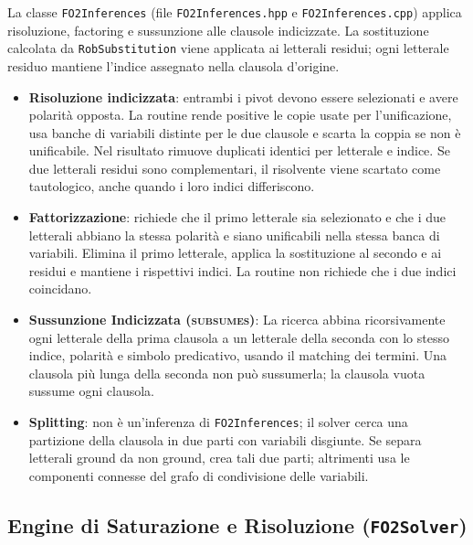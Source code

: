 La classe \texttt{FO2Inferences} (file \texttt{FO2Inferences.hpp} e \texttt{FO2Inferences.cpp}) applica risoluzione, factoring e sussunzione alle clausole indicizzate. La sostituzione calcolata da \texttt{RobSubstitution} viene applicata ai letterali residui; ogni letterale residuo mantiene l'indice assegnato nella clausola d'origine.

\begin{itemize}
    \item \textbf{Risoluzione indicizzata}: entrambi i pivot devono essere selezionati e avere polarità opposta. La routine rende positive le copie usate per l'unificazione, usa banche di variabili distinte per le due clausole e scarta la coppia se non è unificabile. Nel risultato rimuove duplicati identici per letterale e indice. Se due letterali residui sono complementari, il risolvente viene scartato come tautologico, anche quando i loro indici differiscono.

    \item \textbf{Fattorizzazione}: richiede che il primo letterale sia selezionato e che i due letterali abbiano la stessa polarità e siano unificabili nella stessa banca di variabili. Elimina il primo letterale, applica la sostituzione al secondo e ai residui e mantiene i rispettivi indici. La routine non richiede che i due indici coincidano.

    \item \textbf{Sussunzione Indicizzata (\textsc{subsumes})}:
    La ricerca abbina ricorsivamente ogni letterale della prima clausola a un letterale della seconda con lo stesso indice, polarità e simbolo predicativo, usando il matching dei termini. Una clausola più lunga della seconda non può sussumerla; la clausola vuota sussume ogni clausola.

    \item \textbf{Splitting}: non è un'inferenza di \texttt{FO2Inferences}; il solver cerca una partizione della clausola in due parti con variabili disgiunte. Se separa letterali ground da non ground, crea tali due parti; altrimenti usa le componenti connesse del grafo di condivisione delle variabili.
\end{itemize}



\newpage
\subsection{Engine di Saturazione e Risoluzione (\texttt{FO2Solver})}
\label{subsec:fo2solver_impl}

